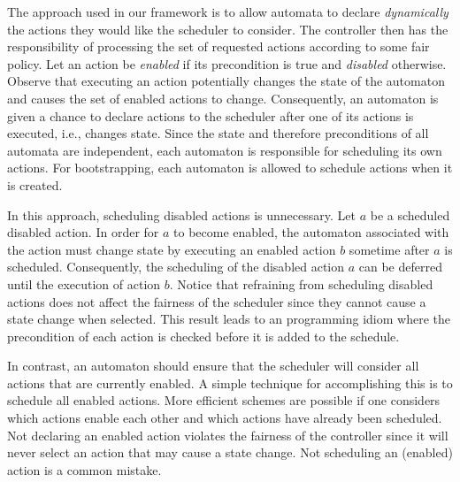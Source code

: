 The approach used in our framework is to allow automata to declare \emph{dynamically} the actions they would like the scheduler to consider.
The controller then has the responsibility of processing the set of requested actions according to some fair policy.
Let an action be \emph{enabled} if its precondition is true and \emph{disabled} otherwise.
Observe that executing an action potentially changes the state of the automaton and causes the set of enabled actions to change.
Consequently, an automaton is given a chance to declare actions to the scheduler after one of its actions is executed, i.e., changes state.
Since the state and therefore preconditions of all automata are independent, each automaton is responsible for scheduling its own actions.
For bootstrapping, each automaton is allowed to schedule actions when it is created.

In this approach, scheduling disabled actions is unnecessary.
Let $a$ be a scheduled disabled action.
In order for $a$ to become enabled, the automaton associated with the action must change state by executing an enabled action $b$ sometime after $a$ is scheduled.
Consequently, the scheduling of the disabled action $a$ can be deferred until the execution of action $b$.
Notice that refraining from scheduling disabled actions does not affect the fairness of the scheduler since they cannot cause a state change when selected.
This result leads to an programming idiom where the precondition of each action is checked before it is added to the schedule.

In contrast, an automaton should ensure that the scheduler will consider all actions that are currently enabled.
A simple technique for accomplishing this is to schedule all enabled actions.
More efficient schemes are possible if one considers which actions enable each other and which actions have already been scheduled.
Not declaring an enabled action violates the fairness of the controller since it will never select an action that may cause a state change.
Not scheduling an (enabled) action is a common mistake.

